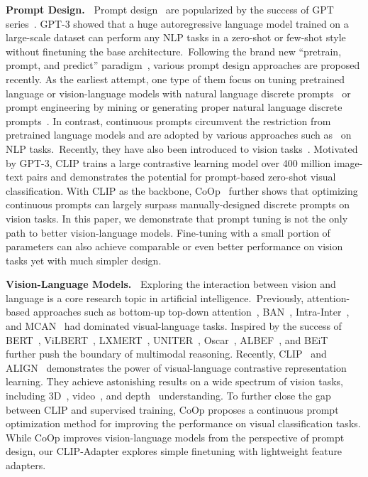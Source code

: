 \documentclass[default,iicol]{sn-jnl}%
\theoremstyle{thmstyleone}%
\theoremstyle{thmstyletwo}%
\theoremstyle{thmstylethree}%
\begin{document}
\vspace{3pt}
\noindent\textbf{Prompt Design.~} Prompt design~\cite{liu2023pre} are popularized by the success of GPT series~\cite{radford2019language,brown2020language}. GPT-3 showed that a huge autoregressive language model trained on a large-scale dataset can perform any NLP tasks in a zero-shot or few-shot style without finetuning the base architecture.~Following the brand new ``pretrain, prompt, and predict'' paradigm~\cite{liu2023pre}, various prompt design approaches are proposed recently. As the earliest attempt, one type of them focus on tuning pretrained language or vision-language models with natural language discrete prompts~\cite{tsimpoukelli2021multimodal,alayrac2022flamingo,wang2022simvlm,yao-etal-2022-pevl,yao2021cpt,gao2021making} or prompt engineering by mining or generating proper natural language discrete prompts~\cite{jiang2020can,shin2020autoprompt,gao2021making}. In contrast, continuous prompts circumvent the restriction from pretrained language models and are adopted by various approaches such as~\cite{gu2022ppt,li2021prefix,liu2021gpt,lester2021power} on NLP tasks.~Recently, they have also been introduced to vision tasks~\cite{jia2022visual}. Motivated by GPT-3, CLIP trains a large contrastive learning model over 400 million image-text pairs and demonstrates the potential for prompt-based zero-shot visual classification. With CLIP as the backbone, CoOp~\cite{zhou2021coop} further shows that optimizing continuous prompts can largely surpass manually-designed discrete prompts on vision tasks. In this paper, we demonstrate that prompt tuning is not the only path to better vision-language models. Fine-tuning with a small portion of parameters can also achieve comparable or even better performance on vision tasks yet with much simpler design.

\vspace{3pt}
\noindent\textbf{Vision-Language Models.~} Exploring the interaction between vision and language is a core research topic in artificial intelligence.~Previously, attention-based approaches such as bottom-up top-down attention~\cite{anderson2018bottom}, BAN~\cite{kim2018bilinear}, Intra-Inter~\cite{gao2019dynamic}, and MCAN~\cite{yu2019deep} had dominated visual-language tasks. Inspired by the success of BERT~\cite{devlin2019bert}, ViLBERT~\cite{lu2019vilbert}, LXMERT~\cite{tan2019lxmert}, UNITER~\cite{chen2020uniter}, Oscar~\cite{li2020oscar}, ALBEF~\cite{li2021align}, and BEiT~\cite{wang2022image} further push the boundary of multimodal reasoning. Recently, CLIP~\cite{radford2021learning} and ALIGN~\cite{jia2021scaling} demonstrates the power of visual-language contrastive representation learning. They achieve astonishing results on a wide spectrum of vision tasks, including 3D~\cite{zhu2022pointclip,zhang2023learning}, video~\cite{lin2022frozen}, and depth~\cite{zhang2022can} understanding. To further close the gap between CLIP and supervised training, CoOp proposes a continuous prompt optimization method for improving the performance on visual classification tasks. While CoOp improves vision-language models from the perspective of prompt design, our CLIP-Adapter explores simple finetuning with lightweight feature adapters.
\end{document}
